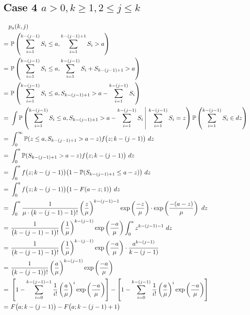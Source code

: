 \subsection{Case 4 $a > 0, k \geq 1, 2 \leq j \leq k$}
\begin{align*}
	& p_{a} (k, j) \\
	= & \ \mathbb{P} \left( \sum_{i = 1}^{k - (j - 1)} S_{i} \leq a, \sum_{i = 1}^{k - (j - 1) + 1} S_{i} > a \right) \\
	= & \ \mathbb{P} \left( \sum_{i = 1}^{k - (j - 1)} S_{i} \leq a, \sum_{i = 1}^{k - (j - 1)} S_{i} + S_{k - (j - 1) + 1} > a \right) \\
	= & \ \mathbb{P} \left( \sum_{i = 1}^{k - (j - 1)} S_{i} \leq a, S_{k - (j - 1) + 1} > a - \sum_{i = 1}^{k - (j - 1)} S_{i} \right) \\
	= & \ \int \mathbb{P} \left( \sum_{i = 1}^{k - (j - 1)} S_{i} \leq a, S_{k - (j - 1) + 1} > a - \sum_{i = 1}^{k - (j -1)} S_{i} \ \vline \ \sum_{i = 1}^{k - (j - 1)} S_{i} = z \right) \mathbb{P} \left( \sum_{i = 1}^{k - (j - 1)} S_{i} \in d z \right) \\
	= & \ \int_{0}^{\infty} \mathbb{P} (z \leq a, S_{k - (j - 1) + 1} > a - z) f \big( z; k - (j - 1) \big) \ d z \\
	= & \ \int_{0}^{a} \mathbb{P} (S_{k - (j - 1) + 1} > a - z) f \big( z; k - (j - 1) \big) \ d z \\
	= & \ \int_{0}^{a} f \big( z; k - (j - 1) \big) \big( 1 - \mathbb{P} (S_{k - (j - 1) + 1} \leq a - z) \big) \ d z \\
	= & \ \int_{0}^{a} f \big( z; k - (j - 1) \big) \big( 1 - F (a - z; 1) \big) \ d z \\
	= & \ \int_{0}^{a} \frac{1}{\mu \cdot \big( k - (j - 1) - 1 \big)!} \left( \frac{z}{\mu} \right)^{k - (j - 1) - 1} \exp \left( \frac{-z}{\mu} \right) \cdot \exp \left( \frac{- (a - z)}{\mu} \right) \ d z \\
	= & \ \frac{1}{\big( k - (j - 1) - 1 \big)!} \left( \frac{1}{\mu} \right)^{k - (j - 1)} \exp \left( \frac{- a}{\mu} \right) \int_{0}^{a} z^{k - (j - 1) - 1} \ d z \\
	= & \ \frac{1}{\big( k - (j - 1) - 1 \big)!} \left( \frac{1}{\mu} \right)^{k - (j - 1)} \exp \left( \frac{- a}{\mu} \right) \cdot \frac{a^{k - (j - 1)}}{k - (j - 1)} \\
	= & \ \frac{1}{\big( k - (j - 1) \big)!} \left( \frac{a}{\mu} \right)^{k - (j - 1)} \exp \left( \frac{- a}{\mu} \right) \\
	= & \ \left[ 1 - \sum_{i = 0}^{k - (j - 1) - 1} \frac{1}{i!} \left( \frac{a}{\mu} \right)^{i} \exp \left( \frac{- a}{\mu} \right) \right] - \left[ 1 - \sum_{i = 0}^{k - (j - 1)} \frac{1}{i!} \left( \frac{a}{\mu} \right)^{i} \exp \left( \frac{- a}{\mu} \right) \right] \\
	= & \ F \big( a; k - (j - 1) \big) - F \big( a; k - (j - 1) + 1 \big)
\end{align*}

